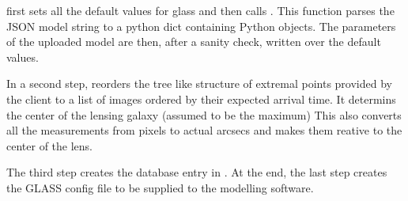  first sets all the default values for glass and then calls .
This function parses the JSON model string to a python dict containing Python objects.
The parameters of the uploaded model are then, after a sanity check, written over the default values.

In a second step,  reorders the tree like structure of extremal points provided by the client to a list of images ordered by their expected arrival time. It determins the center of the lensing galaxy (assumed to be the maximum) This also converts all the measurements from \spl pixels to actual arcsecs and makes them reative to the center of the lens.

The third step  creates the database entry in .
At the end, the last step  creates the GLASS config file to be supplied to the modelling software.










